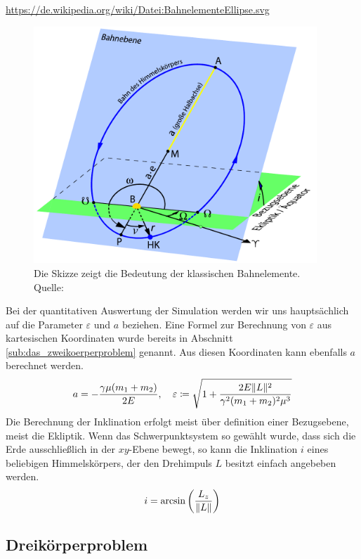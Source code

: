     \urldef{\bahnelementeScetch}\url{https://de.wikipedia.org/wiki/Datei:BahnelementeEllipse.svg}
    \begin{figure}[h]
      \center
      \includegraphics[width=0.95\textwidth]{pictures/BahnelementeEllipse.pdf}
      \caption{Die Skizze zeigt die Bedeutung der klassischen Bahnelemente. \\ Quelle:\\ \bahnelementeScetch}
      \label{fig:bahnelemente-scetch}
    \end{figure}
    Bei der quantitativen Auswertung der Simulation werden wir uns hauptsächlich auf die Parameter $\varepsilon$ und $a$ beziehen.
    Eine Formel zur Berechnung von $\varepsilon$ aus kartesischen Koordinaten wurde bereits in Abschnitt \ref{sub:das_zweikoerperproblem} genannt.
    Aus diesen Koordinaten kann ebenfalls $a$ berechnet werden.
    \[
      a = - \frac{\gamma\mu (m_1+m_2)}{2E}
      ,\quad
      \varepsilon \coloneqq \sqrt{1 + \frac{2E\|L\|^2}{\gamma^2(m_1+m_2)^2\mu^3}}
    \]
    Die Berechnung der Inklination erfolgt meist über definition einer Bezugsebene, meist die Ekliptik.
    Wenn das Schwerpunktsystem so gewählt wurde, dass sich die Erde ausschließlich in der $xy$-Ebene bewegt, so kann die Inklination $i$ eines beliebigen Himmelskörpers, der den Drehimpuls $L$ besitzt einfach angebeben werden.
    \[
      i = \arcsin \left(\frac{L_z}{\|L\|}\right)
    \]


  \subsection{Dreikörperproblem} %
  \label{sub:dreikörperproblem}

